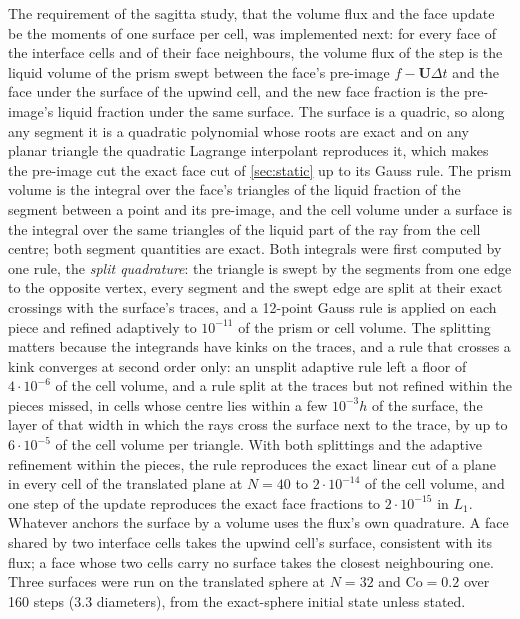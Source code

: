 \documentclass[preprint,12pt]{elsarticle}
\begin{document}
The requirement of the sagitta study, that the volume flux and the face update be the moments of one surface per cell, was implemented next: for every face of the interface cells and of their face neighbours, the volume flux of the step is the liquid volume of the prism swept between the face's pre-image $f - \mathbf{U}\Delta t$ and the face under the surface of the upwind cell, and the new face fraction is the pre-image's liquid fraction under the same surface. The surface is a quadric, so along any segment it is a quadratic polynomial whose roots are exact and on any planar triangle the quadratic Lagrange interpolant reproduces it, which makes the pre-image cut the exact face cut of \cref{sec:static} up to its Gauss rule. The prism volume is the integral over the face's triangles of the liquid fraction of the segment between a point and its pre-image, and the cell volume under a surface is the integral over the same triangles of the liquid part of the ray from the cell centre; both segment quantities are exact. Both integrals were first computed by one rule, the \emph{split quadrature}: the triangle is swept by the segments from one edge to the opposite vertex, every segment and the swept edge are split at their exact crossings with the surface's traces, and a 12-point Gauss rule is applied on each piece and refined adaptively to $10^{-11}$ of the prism or cell volume. The splitting matters because the integrands have kinks on the traces, and a rule that crosses a kink converges at second order only: an unsplit adaptive rule left a floor of $4\cdot10^{-6}$ of the cell volume, and a rule split at the traces but not refined within the pieces missed, in cells whose centre lies within a few $10^{-3} h$ of the surface, the layer of that width in which the rays cross the surface next to the trace, by up to $6\cdot10^{-5}$ of the cell volume per triangle. With both splittings and the adaptive refinement within the pieces, the rule reproduces the exact linear cut of a plane in every cell of the translated plane at $N = 40$ to $2\cdot10^{-14}$ of the cell volume, and one step of the update reproduces the exact face fractions to $2\cdot10^{-15}$ in $L_1$. Whatever anchors the surface by a volume uses the flux's own quadrature. A face shared by two interface cells takes the upwind cell's surface, consistent with its flux; a face whose two cells carry no surface takes the closest neighbouring one. Three surfaces were run on the translated sphere at $N = 32$ and $\mathrm{Co} = 0.2$ over 160 steps (3.3 diameters), from the exact-sphere initial state unless stated.
\end{document}
